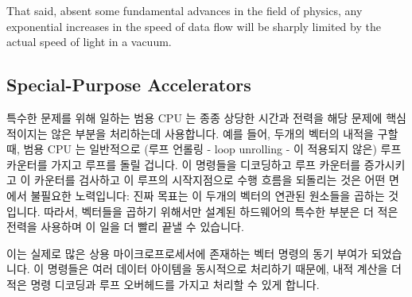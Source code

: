That said, absent some fundamental advances in the field of physics,
any exponential increases in the speed of data flow
will be sharply limited by the actual speed of light in a vacuum.

\fi

\subsection{Special-Purpose Accelerators}
\label{sec:cpu:Special-Purpose Accelerators}

특수한 문제를 위해 일하는 범용 CPU 는 종종 상당한 시간과 전력을 해당 문제에
핵심적이지는 않은 부분을 처리하는데 사용합니다.
예를 들어, 두개의 벡터의 내적을 구할 때, 범용 CPU 는 일반적으로 (루프 언롤링 -
loop unrolling - 이 적용되지 않은) 루프 카운터를 가지고 루프를 돌릴 겁니다.
이 명령들을 디코딩하고 루프 카운터를 증가시키고 이 카운터를 검사하고 이 루프의
시작지점으로 수행 흐름을 되돌리는 것은 어떤 면에서 불필요한 노력입니다: 진짜
목표는 이 두개의 벡터의 연관된 원소들을 곱하는 것입니다.
따라서, 벡터들을 곱하기 위해서만 설계된 하드웨어의 특수한 부분은 더 적은 전력을
사용하며 이 일을 더 빨리 끝낼 수 있습니다.

이는 실제로 많은 상용 마이크로프로세서에 존재하는 벡터 명령의 동기 부여가
되었습니다.
이 명령들은 여러 데이터 아이템을 동시적으로 처리하기 때문에, 내적 계산을 더
적은 명령 디코딩과 루프 오버헤드를 가지고 처리할 수 있게 합니다.

\iffalse

A general-purpose CPU working on a specialized problem is often spending
significant time and energy doing work that is only tangentially related
to the problem at hand.
For example, when taking the dot product of a pair of vectors, a
general-purpose CPU will normally use a loop (possibly unrolled)
with a loop counter.
Decoding the instructions, incrementing the loop counter, testing this
counter, and branching back to the
top of the loop are in some sense wasted effort: the real goal is
instead to multiply corresponding elements of the two vectors.
Therefore, a specialized piece of hardware designed specifically to
multiply vectors could get the job done more quickly and with less
energy consumed.

This is in fact the motivation for the vector instructions present in
many commodity microprocessors.
Because these instructions operate on multiple data items simultaneously,
they would permit a dot product to be computed with less instruction-decode
and loop overhead.

\fi

